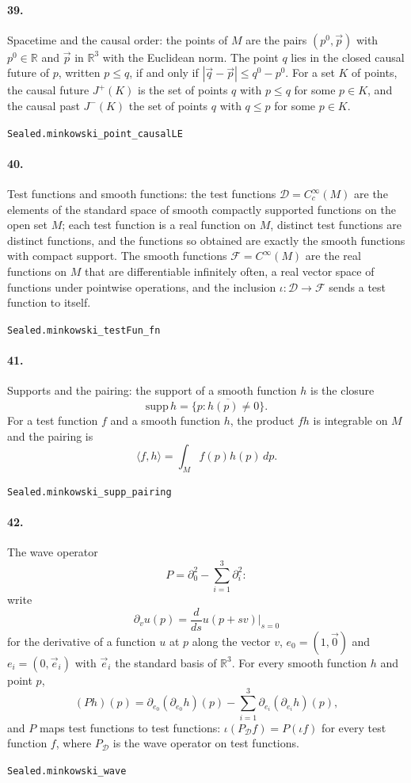 \documentclass[11pt]{article}
\begin{document}
\paragraph{39.} Spacetime and the causal order: the points of $M$ are the pairs $(p^0, \vec p)$ with $p^0 \in \mathbb R$ and $\vec p$ in $\mathbb R^3$ with the Euclidean norm. The point $q$ lies in the closed causal future of $p$, written $p \le q$, if and only if $|\vec q - \vec p| \le q^0 - p^0$. For a set $K$ of points, the causal future $J^+(K)$ is the set of points $q$ with $p \le q$ for some $p \in K$, and the causal past $J^-(K)$ the set of points $q$ with $q \le p$ for some $p \in K$.\par{\footnotesize\texttt{Sealed.minkowski\_point\_causalLE}}

\paragraph{40.} Test functions and smooth functions: the test functions $\mathcal D = C_c^\infty(M)$ are the elements of the standard space of smooth compactly supported functions on the open set $M$; each test function is a real function on $M$, distinct test functions are distinct functions, and the functions so obtained are exactly the smooth functions with compact support. The smooth functions $\mathcal F = C^\infty(M)$ are the real functions on $M$ that are differentiable infinitely often, a real vector space of functions under pointwise operations, and the inclusion $\iota : \mathcal D \to \mathcal F$ sends a test function to itself.\par{\footnotesize\texttt{Sealed.minkowski\_testFun\_fn}}

\paragraph{41.} Supports and the pairing: the support of a smooth function $h$ is the closure \[\mathrm{supp}\, h = \overline{\{p : h(p) \ne 0\}}.\] For a test function $f$ and a smooth function $h$, the product $f h$ is integrable on $M$ and the pairing is \[\langle f, h \rangle = \int_M f(p) h(p)\, dp.\]\par{\footnotesize\texttt{Sealed.minkowski\_supp\_pairing}}

\paragraph{42.} The wave operator \[P = \partial_0^2 - \sum_{i=1}^3 \partial_i^2:\] write \[\partial_v u(p) = \frac{d}{ds} u(p + s v)\big|_{s=0}\] for the derivative of a function $u$ at $p$ along the vector $v$, $e_0 = (1, \vec 0)$ and $e_i = (0, \vec e_i)$ with $\vec e_i$ the standard basis of $\mathbb R^3$. For every smooth function $h$ and point $p$, \[(P h)(p) = \partial_{e_0}(\partial_{e_0} h)(p) - \sum_{i=1}^3 \partial_{e_i}(\partial_{e_i} h)(p),\] and $P$ maps test functions to test functions: $\iota(P_{\mathcal D} f) = P(\iota f)$ for every test function $f$, where $P_{\mathcal D}$ is the wave operator on test functions.\par{\footnotesize\texttt{Sealed.minkowski\_wave}}
\end{document}
